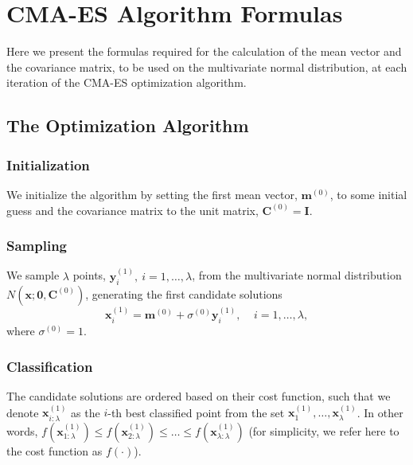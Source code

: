 
\chapter{CMA-ES Algorithm Formulas}
\label{chapter:CMAESAlg}

Here we present the formulas required for the calculation of the mean vector and the covariance matrix, to be used on the multivariate normal distribution, at each iteration of the CMA-ES optimization algorithm.

\section{The Optimization Algorithm}
\subsection{Initialization}
We initialize the algorithm by setting the first mean vector, $\mathbf{m}^{(0)}$, to some initial guess and the covariance matrix to the unit matrix, $\mathbf{C}^{(0)}=\mathbf{I}$.

\subsection{Sampling}
We sample $\lambda$ points, $\mathbf{y}_i^{(1)},\ i=1,\ldots,\lambda$, from the multivariate normal distribution $N(\mathbf{x};\mathbf{0},\mathbf{C}^{(0)})$, generating the first candidate solutions
\begin{equation}
\mathbf{x}^{(1)}_i=\mathbf{m}^{(0)}+\sigma^{(0)}\mathbf{y}^{(1)}_i, \ \ \ \ \ i=1,\ldots,\lambda,
\end{equation} 
\noindent where $\sigma^{(0)}=1$.

\subsection{Classification}
The candidate solutions are ordered based on their cost function, such that we denote $\mathbf{x}^{(1)}_{i:\lambda}$ as the $i$-th best classified point from the set $\mathbf{x}^{(1)}_1,\ldots,\mathbf{x}^{(1)}_\lambda$. In other words, $f(\mathbf{x}_{1:\lambda}^{(1)})\leq f(\mathbf{x}_{2:\lambda}^{(1)})\leq\ldots\leq f(\mathbf{x}_{\lambda:\lambda}^{(1)})$ (for simplicity, we refer here to the cost function as $f(\cdot)$).

